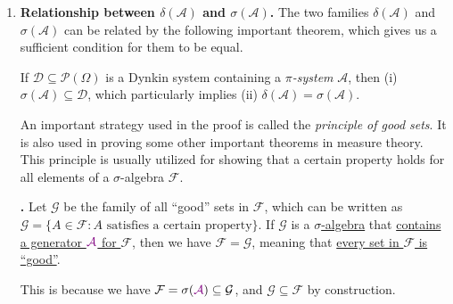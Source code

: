 \begin{enumerate}
\item \textbf{Relationship between \(\delta(\mathcal{A})\) and
\(\sigma(\mathcal{A})\).} The two families \(\delta(\mathcal{A})\) and
\(\sigma(\mathcal{A})\) can be related by the following important theorem,
which gives us a sufficient condition for them to be equal.
\begin{theorem}
\label{thm:dynkin-pi-lambda}
If \(\mathcal{D}\subseteq \mathcal{P}(\Omega)\) is a Dynkin system containing a
\emph{\(\pi\)-system} \(\mathcal{A}\), then (i) \(\sigma(\mathcal{A})\subseteq
\mathcal{D}\), which particularly implies (ii)
\(\delta(\mathcal{A})=\sigma(\mathcal{A})\).
\end{theorem}
An important strategy used in the proof is called the \emph{principle of good
sets}. It is also used in proving some other important theorems in measure
theory. This principle is usually utilized for showing that a certain property
holds for all elements of a \(\sigma\)-algebra \(\mathcal{F}\).

\textbf{.} Let \(\mathcal{G}\) be the family of
all ``good'' sets in \(\mathcal{F}\), which can be written as
\(\mathcal{G}=\{A\in\mathcal{F}:A\text{ satisfies a certain property}\}\). If
\(\mathcal{G}\) is a \underline{\(\sigma\)-algebra} that \underline{contains a
generator \({\color{violet}\mathcal{A}}\) for \(\mathcal{F}\)}, then we have
\(\mathcal{F}=\mathcal{G}\), meaning that \underline{every set in
\(\mathcal{F}\) is ``good''}.
\begin{note}
This is because we have \(\mathcal{F}=\sigma({\color{violet}\mathcal{A}})\subseteq
\mathcal{G}\), and \(\mathcal{G}\subseteq \mathcal{F}\) by construction.
\end{note}



\end{enumerate}
